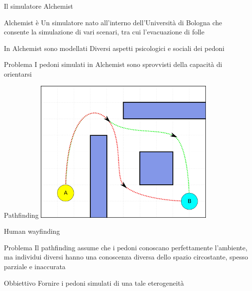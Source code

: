 \documentclass{beamer}
\begin{document}
\begin{frame}{Il simulatore Alchemist}
\begin{block}{Alchemist è}
Un simulatore nato all'interno dell'Università di Bologna che consente la simulazione di vari scenari, tra cui l'evacuazione di folle
\end{block}
\begin{block}{In Alchemist sono modellati}
Diversi aspetti psicologici e sociali dei pedoni
\end{block}
\begin{alertblock}{Problema}
I pedoni simulati in Alchemist sono sprovvisti della capacità di \textcolor{bostonuniversityred}{orientarsi}
\end{alertblock}
\end{frame}

\begin{frame}[fragile]{Pathfinding}
\hfil\hfil\includegraphics[width=9cm]{figures/pathfinding.png}
\end{frame}

\begin{frame}{Human wayfinding}
\begin{alertblock}{Problema}
Il pathfinding assume che i pedoni conoscano perfettamente l'ambiente, ma individui diversi hanno una \textcolor{bostonuniversityred}{conoscenza diversa} dello spazio circostante, spesso \textcolor{bostonuniversityred}{parziale} e \textcolor{bostonuniversityred}{inaccurata}
\end{alertblock}
\begin{block}{Obbiettivo}
Fornire i pedoni simulati di una tale eterogeneità
\end{block}
\end{frame}
\end{document}
